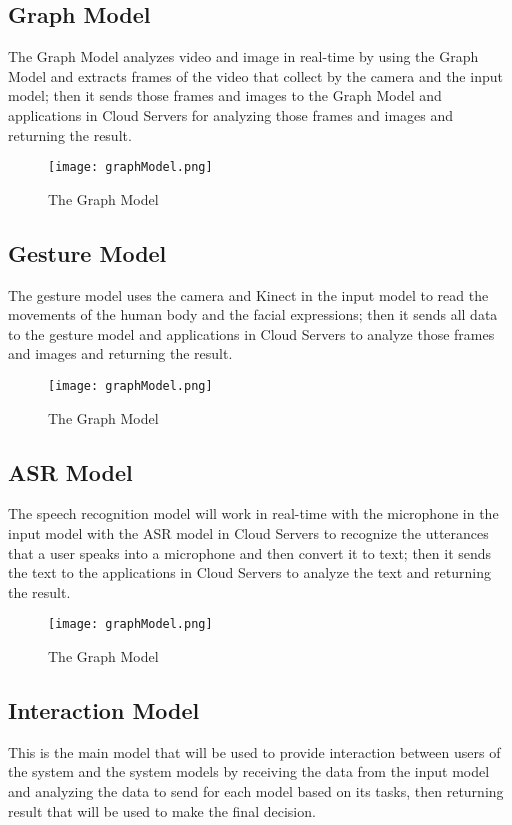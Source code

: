 \documentclass[12pt,a4paper]{article}
\begin{document}
\subsection{Graph Model}
\par The Graph Model analyzes video and image in real-time by
using the Graph Model and extracts frames of the video that
collect by the camera and the input model; then it sends those
frames and images to the Graph Model and applications in
Cloud Servers for analyzing those frames and images and
returning the result.

\begin{figure}[h]
	\centering
	\texttt{[image: graphModel.png]}
	\caption{The Graph Model}
\end{figure}

\subsection{Gesture Model}
\par The gesture model uses the camera and Kinect in the input
model to read the movements of the human body and the facial
expressions; then it sends all data to the gesture model and
applications in Cloud Servers to analyze those frames and
images and returning the result.
\par 

\begin{figure}[h]
	\centering
	\texttt{[image: graphModel.png]}
	\caption{The Graph Model}
\end{figure}

\newpage
\subsection{ASR Model}
\par The speech recognition model will work in real-time with
the microphone in the input model with the ASR model in
Cloud Servers to recognize the utterances that a user speaks
into a microphone and then convert it to text; then it sends the
text to the applications in Cloud Servers to analyze the text and
returning the result.

\begin{figure}[h]
	\centering
	\texttt{[image: graphModel.png]}
	\caption{The Graph Model}
\end{figure}

\subsection{Interaction Model}
\par This is the main model that will be used to provide
interaction between users of the system and the system models
by receiving the data from the input model and analyzing the
data to send for each model based on its tasks, then returning
result that will be used to make the final decision.
\par 
\end{document}
